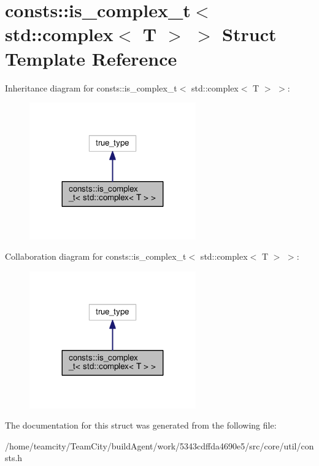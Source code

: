 \hypertarget{structconsts_1_1is__complex__t_3_01std_1_1complex_3_01T_01_4_01_4}{}\section{consts\+:\+:is\+\_\+complex\+\_\+t$<$ std\+:\+:complex$<$ T $>$ $>$ Struct Template Reference}
\label{structconsts_1_1is__complex__t_3_01std_1_1complex_3_01T_01_4_01_4}


Inheritance diagram for consts\+:\+:is\+\_\+complex\+\_\+t$<$ std\+:\+:complex$<$ T $>$ $>$\+:
\nopagebreak
\begin{figure}[H]
\begin{center}
\leavevmode
\includegraphics[width=203pt]{structconsts_1_1is__complex__t_3_01std_1_1complex_3_01T_01_4_01_4__inherit__graph}
\end{center}
\end{figure}


Collaboration diagram for consts\+:\+:is\+\_\+complex\+\_\+t$<$ std\+:\+:complex$<$ T $>$ $>$\+:
\nopagebreak
\begin{figure}[H]
\begin{center}
\leavevmode
\includegraphics[width=203pt]{structconsts_1_1is__complex__t_3_01std_1_1complex_3_01T_01_4_01_4__coll__graph}
\end{center}
\end{figure}


The documentation for this struct was generated from the following file\+:\begin{DoxyCompactItemize}
\item 
/home/teamcity/\+Team\+City/build\+Agent/work/5343cdffda4690e5/src/core/util/consts.\+h\end{DoxyCompactItemize}
